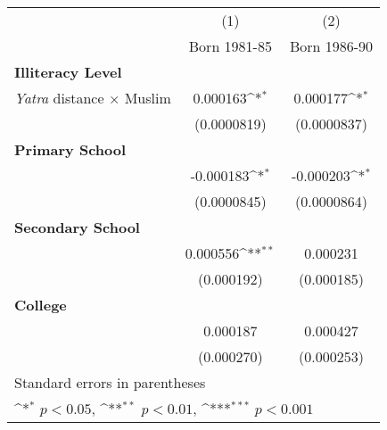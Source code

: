 {
\def\sym#1{\ifmmode^{#1}\else\(^{#1}\)\fi}
\begin{tabular}{l*{2}{c}}
\hline\hline
            &\multicolumn{1}{c}{(1)}&\multicolumn{1}{c}{(2)}\\
            &\multicolumn{1}{c}{Born 1981-85}&\multicolumn{1}{c}{Born 1986-90}\\
[1em]
\hline
\textbf{Illiteracy Level} & & \\
[1em]
\textit{Yatra} distance $\times$ Muslim &    0.000163\sym{*} &    0.000177\sym{*}  \\
            &  (0.0000819)         & (0.0000837)         \\
[1em]
\hline
\textbf{Primary School} & & \\
[1em]
&   -0.000183\sym{*} &  -0.000203\sym{*} \\
& (0.0000845)         & (0.0000864)         \\
[1em]
\hline
\textbf{Secondary School} & & \\
[1em]
&    0.000556\sym{**} &    0.000231         \\
&  (0.000192)         &  (0.000185)         \\
[1em]
\hline
\textbf{College} & & \\
[1em]
&    0.000187 &    0.000427\\
&  (0.000270) &  (0.000253)\\
[1em]
\hline\hline
\multicolumn{3}{l}{\footnotesize Standard errors in parentheses}\\
\multicolumn{3}{l}{\footnotesize \sym{*} \(p<0.05\), \sym{**} \(p<0.01\), \sym{***} \(p<0.001\)}\\
\end{tabular}
}